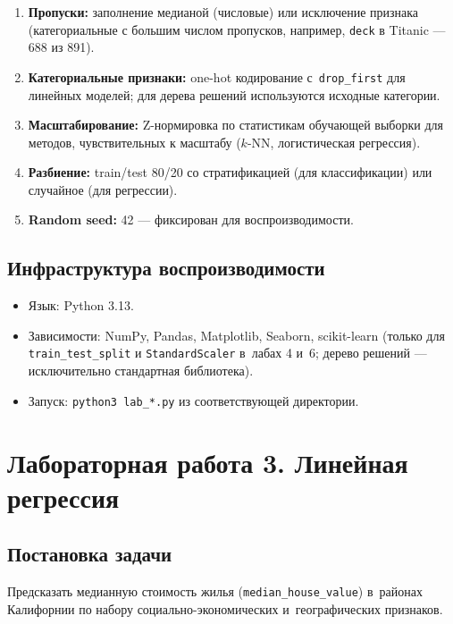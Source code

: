 \documentclass[12pt,a4paper]{article}
\begin{document}
\begin{enumerate}
    \item \textbf{Пропуски:} заполнение медианой (числовые) или
          исключение признака (категориальные с большим числом
          пропусков, например, \texttt{deck} в Titanic — 688 из 891).
    \item \textbf{Категориальные признаки:} one-hot кодирование
          с~\texttt{drop\_first} для линейных моделей; для дерева
          решений используются исходные категории.
    \item \textbf{Масштабирование:} Z-нормировка по статистикам
          обучающей выборки для методов, чувствительных к масштабу
          (\(k\)-NN, логистическая регрессия).
    \item \textbf{Разбиение:} train/test 80/20 со стратификацией
          (для классификации) или случайное (для регрессии).
    \item \textbf{Random seed:} 42 — фиксирован для воспроизводимости.
\end{enumerate}

\subsection{Инфраструктура воспроизводимости}

\begin{itemize}
    \item Язык: Python 3.13.
    \item Зависимости: NumPy, Pandas, Matplotlib, Seaborn, scikit-learn
          (только для \texttt{train\_test\_split} и
          \texttt{StandardScaler} в~лабах 4 и~6; дерево решений —
          исключительно стандартная библиотека).
    \item Запуск: \texttt{python3 lab\_*.py} из соответствующей
          директории.
\end{itemize}

\newpage

\section{Лабораторная работа 3. Линейная регрессия}

\subsection{Постановка задачи}

Предсказать медианную стоимость жилья (\texttt{median\_house\_value})
в~районах Калифорнии по набору социально-экономических
и~географических признаков.
\end{document}
